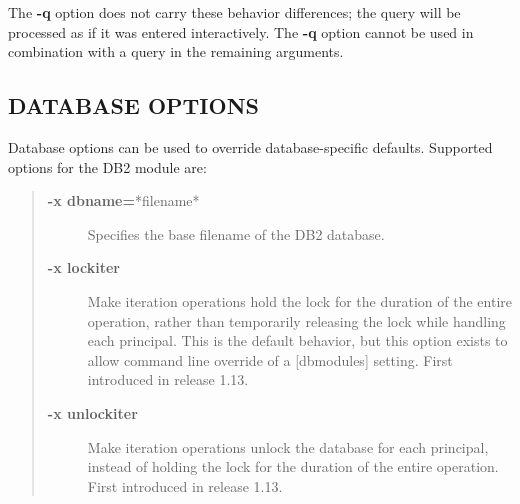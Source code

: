 \documentclass[letterpaper,10pt,english]{sphinxmanual}
\begin{document}
The \textbf{-q} option does not carry these behavior differences; the query
will be processed as if it was entered interactively.  The \textbf{-q}
option cannot be used in combination with a query in the remaining
arguments.


\subsection{DATABASE OPTIONS}
\label{admin/admin_commands/kadmin_local:database-options}\label{admin/admin_commands/kadmin_local:dboptions}
Database options can be used to override database-specific defaults.
Supported options for the DB2 module are:
\begin{quote}
\begin{description}
\item[{\textbf{-x dbname=}*filename*}] \leavevmode
Specifies the base filename of the DB2 database.

\item[{\textbf{-x lockiter}}] \leavevmode
Make iteration operations hold the lock for the duration of
the entire operation, rather than temporarily releasing the
lock while handling each principal.  This is the default
behavior, but this option exists to allow command line
override of a {[}dbmodules{]} setting.  First introduced in
release 1.13.

\item[{\textbf{-x unlockiter}}] \leavevmode
Make iteration operations unlock the database for each
principal, instead of holding the lock for the duration of the
entire operation.  First introduced in release 1.13.

\end{description}
\end{quote}
\end{document}
